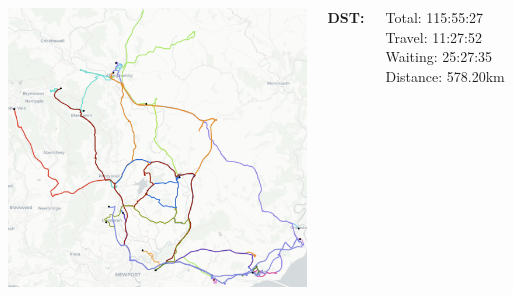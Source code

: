 \documentclass[usenames,dvipsnames]{beamer}
\begin{document}
\begin{frame}
\begin{columns}
		\begin{minipage}[c][0.65\textheight][c]{\linewidth}
			\centering
			\includegraphics[width=1\linewidth]{figures/05MonmouthDST}
		\end{minipage}
		\begin{minipage}[c][0.2\textheight][c]{\linewidth}
			\scriptsize
			\hspace{17mm}\textbf{DST:}
			\begin{itemize}
				\setlength{\itemindent}{0.5in}
				\ditem Total: 115:55:27
				\ditem Travel: 11:27:52
				\ditem Waiting: 25:27:35
				\ditem Distance: 578.20km
			\end{itemize}
		\end{minipage}
	\end{columns}
\end{frame}
\end{document}
